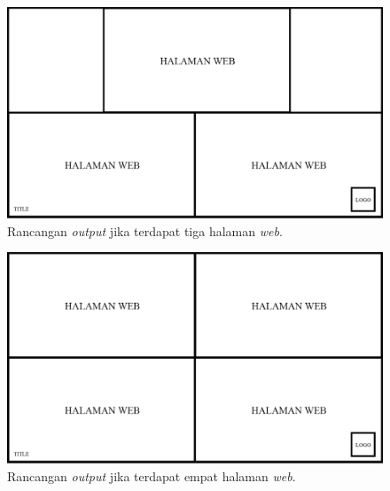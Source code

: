 \begin{figure}[H]
	\centering
		\includegraphics[scale=0.3]{Gambar/output_3.png}
	\caption{Rancangan \textit{output} jika terdapat tiga halaman \textit{web}.}
	\label{fig:output3}
\end{figure}

\begin{figure}[H]
	\centering
		\includegraphics[scale=0.3]{Gambar/output_4.png}
	\caption{Rancangan \textit{output} jika terdapat empat halaman \textit{web}.}
	\label{fig:output4}
\end{figure}
